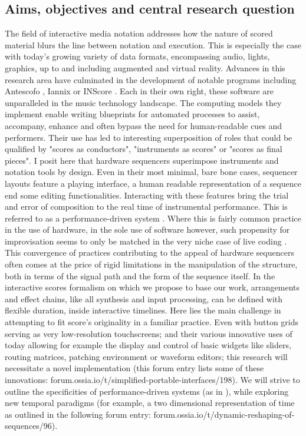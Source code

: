 \documentclass[journal,onecolumn]{IEEEtran}
\begin{document}
\subsection{Aims, objectives and central research question}
The field of interactive media notation addresses how the nature of scored material blurs the line between notation and execution. This is especially the case with today's growing variety of data formats, encompassing audio, lights, graphics, up to and including augmented and virtual reality. 
Advances in this research area have culminated in the development of notable programs including Antescofo \cite{ircam:antescofo}, Iannix \cite{buzzing:iannix} or INScore \cite{grame:inscore}.
Each in their own right, these software are unparalleled in the music technology landscape. The computing models they implement enable writing blueprints for automated processes to assist, accompany, enhance and often bypass the need for human-readable cues and performers. Their use has led to interesting superposition of roles that could be qualified by "scores as conductors", "instruments as scores" or "scores as final pieces". I posit here that hardware sequencers superimpose instruments and notation tools by design. Even in their most minimal, bare bone cases, sequencer layouts feature a playing interface, a human readable representation of a sequence end some editing functionalities.
Interacting with these features bring the trial and error of composition to the real time of instrumental performance. This is referred to as a performance-driven system \cite{nash:liveness}. Where this is fairly common practice in the use of hardware, in the sole use of software however, such propensity for improvisation seems to only be matched in the very niche case of live coding \cite{blackwell:livecoding}.
This convergence of practices contributing to the appeal of hardware sequencers often comes at the price of rigid limitations in the manipulation of the structure, both in terms of the signal path and the form of the sequence itself.
In the interactive scores formalism on which we propose to base our work, arrangements and effect chains, like all synthesis and input processing, can be defined with flexible duration, inside interactive timelines. Here lies the main challenge in attempting to fit score's originality in a familiar practice. Even with button grids serving as very low-resolution touchscreens; and their various innovative uses of today allowing for example the display and control of basic widgets like sliders, routing matrices, patching environment or waveform editors; this research will necessitate a novel implementation (this forum entry lists some of these innovations: forum.ossia.io/t/simplified-portable-interfaces/198). We will strive to outline the specificities of performance-driven systems (as in \cite{nash:liveness}), while exploring new temporal paradigms (for example, a two dimensional representation of time as outlined in the following forum entry: forum.ossia.io/t/dynamic-reshaping-of-sequences/96).
\end{document}
